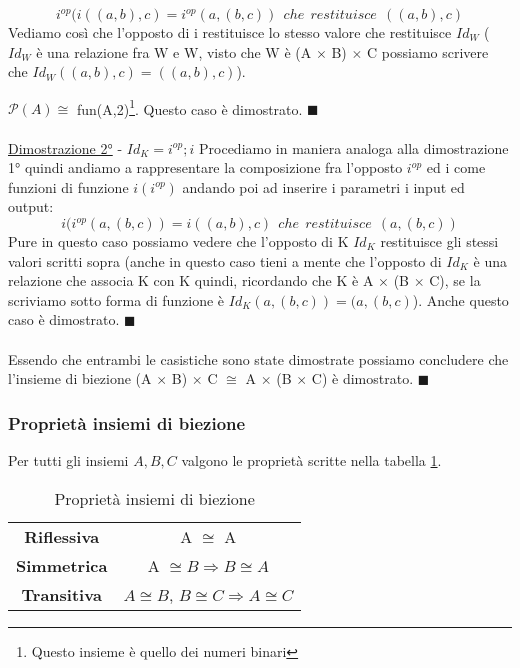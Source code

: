 \begin{example}
\begin{demostration}
\begin{equation}
                    i^{op}(i((a,b),c) = i^{op}(a, (b,c)) \: \: che \: \: restituisce \: \: ((a,b),c)
                \end{equation}
                Vediamo così che l'opposto di i restituisce lo stesso valore che restituisce $Id_W$ ($Id_W$ è una relazione fra W e W, visto che W è (A $\times$ B) $\times$ C possiamo scrivere che $Id_W((a,b),c) = ((a, b),c)$).
                \item $\mathcal{P}(A) \cong$ fun(A,2)\footnote{Questo insieme è quello dei numeri binari}. Questo caso è dimostrato. $\blacksquare$\\ \\
                \underline{Dimostrazione 2°} - $Id_K = i^{op};i$
                Procediamo in maniera analoga alla dimostrazione 1° quindi andiamo a rappresentare la composizione fra l'opposto $i^{op}$ ed i come funzioni di funzione $i(i^{op})$ andando poi ad inserire i parametri i input ed output:
                \begin{equation}
                    i(i^{op}(a,(b,c)) = i((a,b),c) \: \: che \: \: restituisce \: \: (a, (b,c))
                \end{equation}
                Pure in questo caso possiamo vedere che l'opposto di K $Id_K$ restituisce gli stessi valori scritti sopra (anche in questo caso tieni a mente che l'opposto di $Id_K$ è una relazione che associa K con K quindi, ricordando che K è A $\times$ (B $\times$ C), se la scriviamo sotto forma di funzione è $Id_K(a,(b,c)) = (a,(b,c)$). Anche questo caso è dimostrato. $\blacksquare$\\ \\
                Essendo che entrambi le casistiche sono state dimostrate possiamo concludere che l'insieme di biezione (A $\times$ B) $\times$ C $\cong$ A $\times$ (B $\times$ C) è dimostrato. $\blacksquare$
        \end{demostration}
\end{example}

\subsubsection{Proprietà insiemi di biezione}
Per tutti gli insiemi $A, B, C$ valgono le proprietà scritte nella tabella \ref{tab:proprietà-insiemi-biezione}.
\begin{table}[h!]
    \centering
    \setlength{\tabcolsep}{8pt}
    \renewcommand{\arraystretch}{2}
    \begin{tabular}{|c|c|}
    \hline
        \textbf{Riflessiva} & A $\cong$ A  \\
        \textbf{Simmetrica} & A $\cong B \Longrightarrow B \cong A$ \\
        \textbf{Transitiva} & $A \cong B$, $B \cong C \Longrightarrow A \cong C$\\ \hline
    \end{tabular}
    \caption{Proprietà insiemi di biezione}
    \label{tab:proprietà-insiemi-biezione}
\end{table}

